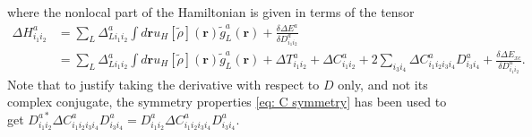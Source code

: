\documentclass[a4paper]{article}
\newcommand{\s}[1]{\tilde{#1}}
\newcommand{\br}{\mathbf{r}}
\begin{document}
%
where the nonlocal part of the Hamiltonian is given in terms of the tensor
%
\begin{equation}
  \begin{split}
    \Delta H^a_{i_1i_2} &= \sum_L \Delta^a_{Li_1i_2} \int d\br u_H[\s{\rho}](\br)\s{g}^a_L(\br) + \frac{\delta \Delta E^a}{\delta D_{i_1i_2}^a}\\
    &= \sum_L \Delta^a_{Li_1i_2} \int d\br u_H[\s{\rho}](\br)\s{g}^a_L(\br) + \Delta T^a_{i_1i_2} + \Delta C^a_{i_1i_2} + 2\sum_{i_3i_4} \Delta C^a_{i_1i_2i_3i_4}D^a_{i_3i_4} + \frac{\delta \Delta E_{xc}}{\delta D^a_{i_1i_2}} .
  \end{split}
\end{equation}
%
Note that to justify taking the derivative with respect to $D$ only,
and not its complex conjugate, the symmetry properties \ref{eq: C
  symmetry} has been used to get $D^{a*}_{i_1i_2}
\Delta C^a_{i_1i_2i_3i_4}D^a_{i_3i_4} = D^{a}_{i_1i_2}
\Delta C^a_{i_1i_2i_3i_4}D^a_{i_3i_4}$.
\end{document}
